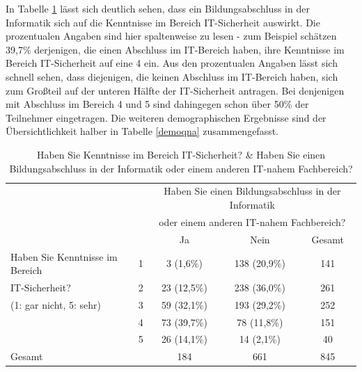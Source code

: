 In Tabelle \ref{4sitsecteach} lässt sich deutlich sehen, dass ein Bildungsabschluss in der Informatik sich auf die Kenntnisse im Bereich IT-Sicherheit auswirkt. Die prozentualen Angaben sind hier spaltenweise zu lesen - zum Beispiel schätzen 39,7\% derjenigen, die einen Abschluss im IT-Bereich haben, ihre Kenntnisse im Bereich IT-Sicherheit auf eine 4 ein. Aus den prozentualen Angaben lässt sich schnell sehen, dass diejenigen, die keinen Abschluss im IT-Bereich haben, sich zum Großteil auf der unteren Hälfte der IT-Sicherheit antragen. Bei denjenigen mit Abschluss im Bereich 4 und 5 sind dahingegen schon über 50\% der Teilnehmer eingetragen.
Die weiteren demographischen Ergebnisse sind der Übersichtlichkeit halber in Tabelle \ref{demoqna} zusammengefasst.\\
\begin{table}
	\begin{tabular}[]{ l c | c | c | c }
	& & \multicolumn{3}{c}{Haben Sie einen Bildungsabschluss in der Informatik}\\
	& & \multicolumn{3}{c}{oder einem anderen IT-nahem Fachbereich?}\\ \hline
	& & Ja & Nein & Gesamt\\ \hline
	Haben Sie Kenntnisse im Bereich& 1 & 3 (1,6\%) & 138 (20,9\%) & 141\\
	IT-Sicherheit?& 2 & 23 (12,5\%) & 238 (36,0\%) & 261\\
	(1: gar nicht, 5: sehr)& 3 & 59 (32,1\%) & 193 (29,2\%) & 252\\
	& 4 & 73 (39,7\%) & 78 (11,8\%) & 151\\
	& 5 & 26 (14,1\%) & 14 (2,1\%) & 40\\ \hline
	Gesamt & & 184 & 661 & 845\\ \hline
	\end{tabular}
	\caption{Haben Sie Kenntnisse im Bereich IT-Sicherheit? \& Haben Sie einen Bildungsabschluss in der Informatik oder einem anderen IT-nahem Fachbereich?}\label{4sitsecteach}
\end{table}

